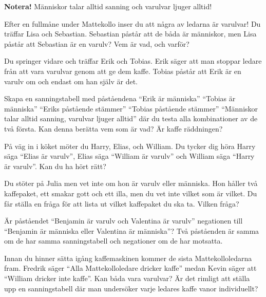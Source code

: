 \noindent
\textbf{Notera!}  Människor talar alltid sanning och varulvar ljuger alltid!

\begin{problem}
	Efter en fullmåne under Mattekollo inser du att några av ledarna är varulvar! Du träffar Lisa och Sebastian. Sebastian påstår att de båda är människor, men Lisa påstår att Sebastian är en varulv? Vem är vad, och varför?
\end{problem}

\begin{problem}
	Du springer vidare och träffar Erik och Tobias. Erik säger att man stoppar ledare från att vara varulvar genom att ge dem kaffe. Tobias påstår att Erik är en varulv om och endast om han själv är det.

	Skapa en sanningstabell med påståendena ``Erik är människa'' ``Tobias är människa'' ``Eriks påstående stämmer'' ``Tobias påstående stämmer'' ``Människor talar alltid sanning, varulvar ljuger alltid'' där du testa alla kombinationer av de två första. Kan denna berätta vem som är vad? Är kaffe räddningen?
\end{problem}

\begin{problem}
	På väg in i köket möter du Harry, Elias, och William. Du tycker dig höra Harry säga ``Elias är varulv'', Elias säga ``William är varulv'' och William säga ``Harry är varulv''. Kan du ha hört rätt?
\end{problem}

\begin{problem}[Extra]
	Du stöter på Julia men vet inte om hon är varulv eller människa. Hon håller två kaffepaket, ett smakar gott och ett illa, men du vet inte vilket som är vilket. Du får ställa en fråga för att lista ut vilket kaffepaket du ska ta. Vilken fråga?
\end{problem}

\begin{problem}
	Är påståendet ``Benjamin är varulv och Valentina är varulv'' negationen till ``Benjamin är människa eller Valentina är människa''? Två påståenden är samma om de har samma sanningstabell och negationer om de har motsatta.
\end{problem}

\begin{problem}
	Innan du hinner sätta igång kaffemaskinen kommer de sista Mattekolloledarna fram. Fredrik säger ``Alla Mattekolloledare dricker kaffe'' medan Kevin säger att ``William dricker inte kaffe''. Kan båda vara varulvar? Är det rimligt att ställa upp en sanningstabell där man undersöker varje ledares kaffe vanor individuellt?
\end{problem}

